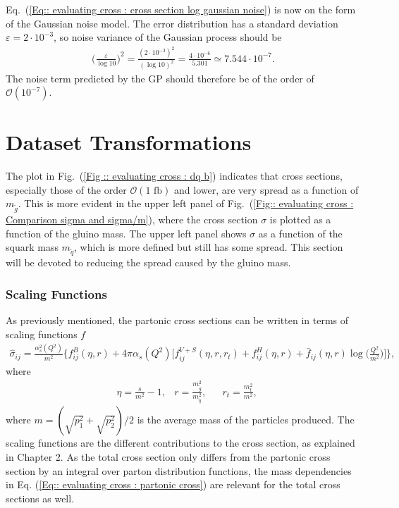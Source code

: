 \documentclass[twoside,english]{uiofysmaster}
\begin{document}
Eq.\ (\ref{Eq:: evaluating cross : cross section log gaussian noise}) is now on the form of the Gaussian noise model. The error distribution has a standard deviation $\varepsilon = 2 \cdot 10^{-3}$, so noise variance of the Gaussian process should be
\begin{align*}
\Big( \frac{\varepsilon}{\log 10} \Big)^2 = \frac{(2 \cdot 10^{-3})^2}{(\log 10)^2} = \frac{4 \cdot 10^{-6}}{5.301} \simeq 7.544 \cdot 10^{-7}.
\end{align*}
The noise term predicted by the GP should therefore be of the order of $\mathcal{O}(10^{-7})$.


\section{Dataset Transformations}

The plot in Fig.\ (\ref{Fig :: evaluating cross : dq b}) indicates that cross sections, especially those of the order $\mathcal{O}(1 \text{ fb})$ and lower, are very spread as a function of $m_{\tilde{g}}$. This is more evident in the upper left panel of Fig.\ (\ref{Fig:: evaluating cross : Comparison sigma and sigma/m}), where the cross section $\sigma$ is plotted as a function of the gluino mass. The upper left panel shows $\sigma$ as a function of the squark mass $m_{\tilde{q}}$, which is more defined but still has some spread. This section will be devoted to reducing the spread caused by the gluino mass.

\subsubsection{Scaling Functions}

As previously mentioned, the partonic cross sections can be written in terms of scaling functions $f$
\begin{align}\label{Eq:: evaluating cross : partonic cross}
\hat{\sigma}_{ij} = \frac{\alpha^2_s (Q^2)}{m^2} \Bigg\{ f^B_{ij}(\eta, r) + 4 \pi \alpha_s (Q^2) \Bigg[ f^{V+S}_{ij}(\eta, r, r_t) + f^H_{ij}(\eta, r) + \bar{f}_{ij} (\eta, r) \log \Big( \frac{Q^2}{m^2} \Big) \Bigg] \Bigg\},
\end{align}
where 
\begin{align*}
&\eta = \frac{s}{m^2} - 1, &r = \frac{m_{\tilde{g}}^2}{m_{\tilde{q}}^2}, &&r_t = \frac{m_t^2}{m^2},
\end{align*}
where $m = (\sqrt{p_1^2} + \sqrt{p_2^2} )/2$ is the average mass of the particles produced. The scaling functions are the different contributions to the cross section, as explained in Chapter 2. As the total cross section only differs from the partonic cross section by an integral over parton distribution functions, the mass dependencies in Eq. (\ref{Eq:: evaluating cross : partonic cross}) are relevant for the total cross sections as well.
\end{document}

